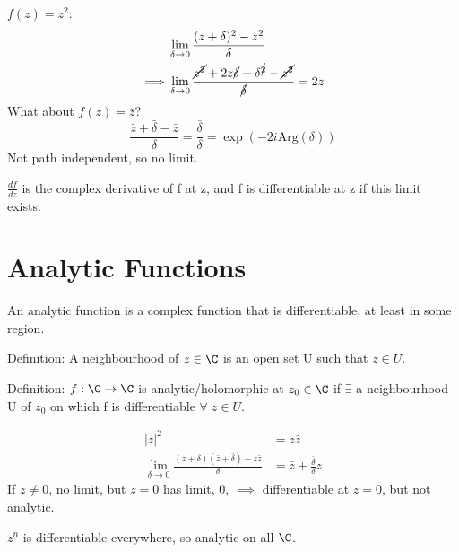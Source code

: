 \documentclass[a4paper, 11pt, normalem]{report}
\begin{document}
\begin{example}
$f(z) = z^2$:
\begin{align}
    & \lim_{\delta\to 0} \frac{(z+\delta)^2 - z^2}{\delta} \\
    \implies & \lim_{\delta\to 0} \frac{\cancel{z^2} + 2z\cancel{\delta} + \delta^{\cancel{2}} - \cancel{z^2}}{\cancel{\delta}} = 2z
\end{align}
What about $f(z) = \bar{z}$?
\begin{equation}
    \frac{\bar{z} + \bar{\delta} - \bar{z}}{\delta} = \frac{\bar{\delta}}{\delta} = \exp{(-2i\mathrm{Arg}(\delta))}
\end{equation}
Not path independent, so no limit.
\end{example}

$\frac{df}{dz}$ is the complex derivative of f at z, and f is differentiable at z if this limit exists.

\section{Analytic Functions}
An analytic function is a complex function that is differentiable, at least in some region.

Definition: A neighbourhood of $z \in \C$ is an open set U such that $z \in U$.

Definition: $f: \C \to \C$ is analytic/holomorphic at $z_0 \in \C$ if $\exists$ a neighbourhood U of $z_0$ on which f is differentiable $\forall \; z \in U$.

\begin{example}
    \begin{align}
        |z|^2 &= z\bar{z} \\
        \lim_{\delta\to 0} \frac{(z+\delta)(\bar{z} + \bar{\delta}) - z\bar{z}}{\delta} &= \bar{z} + \frac{\bar{\delta}}{\delta}z
    \end{align}
If $z \neq 0$, no limit, but $z = 0$ has limit, 0, $\implies$ differentiable at $z = 0$, \underline{but not analytic.}
\end{example}
$z^n$ is differentiable everywhere, so analytic on all $\C$.
\end{document}
